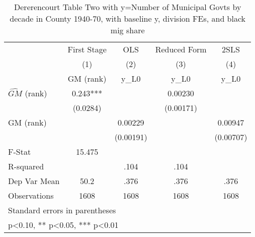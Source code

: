 \begin{table}[htbp]\centering
\def\sym#1{\ifmmode^{#1}\else\(^{#1}\)\fi}
\caption{Dererencourt Table Two with y=Number of Municipal Govts by decade in County 1940-70, with baseline y, division FEs, and black mig share}
\begin{tabular}{l*{4}{c}}
\toprule
                    & First Stage   &         OLS   &Reduced Form   &        2SLS   \\
                    &\multicolumn{1}{c}{(1)}&\multicolumn{1}{c}{(2)}&\multicolumn{1}{c}{(3)}&\multicolumn{1}{c}{(4)}\\
                    &\multicolumn{1}{c}{GM  (rank)}&\multicolumn{1}{c}{y\_L0}&\multicolumn{1}{c}{y\_L0}&\multicolumn{1}{c}{y\_L0}\\
\midrule
$\hat{GM}$ (rank)   &       0.243***&               &     0.00230   &               \\
                    &    (0.0284)   &               &   (0.00171)   &               \\
\addlinespace
GM  (rank)          &               &     0.00229   &               &     0.00947   \\
                    &               &   (0.00191)   &               &   (0.00707)   \\
\midrule
F-Stat              &      15.475   &               &               &               \\
R-squared           &               &        .104   &        .104   &               \\
Dep Var Mean        &        50.2   &        .376   &        .376   &        .376   \\
Observations        &        1608   &        1608   &        1608   &        1608   \\
\bottomrule
\multicolumn{5}{l}{\footnotesize Standard errors in parentheses}\\
\multicolumn{5}{l}{\footnotesize * p<0.10, ** p<0.05, *** p<0.01}\\
\end{tabular}
\end{table}
